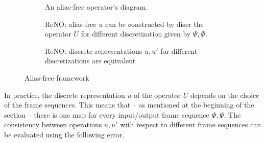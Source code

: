 \documentclass[reqno,10pt]{amsart}
\theoremstyle{plain}
\theoremstyle{definition}
\newcommand{\cal}[1]{\mathcal{#1}}
\begin{document}
    \begin{figure}[!ht]
        \centering
        \begin{subfigure}{0.22\textwidth}
            \centering
            \caption{An alias-free operator's diagram.}
            \label{fig:3A}
        \end{subfigure} \hfill
        \begin{subfigure}{0.28\textwidth}
            \caption{ReNO: alias-free $u$ can be constructed by discr the operator $U$ for different discretization given by $\Psi,\Phi$.}
            \label{fig:3B}
        \end{subfigure}\hfill
        \begin{subfigure}{0.39\textwidth}
            \caption{ReNO: discrete representations $u,u'$ for different discretizations are equivalent}
            \label{fig:3C}
        \end{subfigure}
        \caption{Alias-free framework}
    \end{figure}
    In practice, the discrete representation $u$ of the operator $U$ depends on the choice of the frame sequences. This means that -- as mentioned at the beginning of the section -- there is one map for every input/output frame sequence $\Phi,\Psi$. The consistency between operations $u,u'$ with respect to different frame sequences can be evaluated using the following error.
\end{document}
